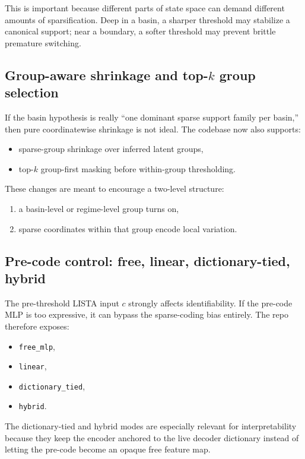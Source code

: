 \documentclass[11pt]{article}
\begin{document}
This is important because different parts of state space can demand different
amounts of sparsification. Deep in a basin, a sharper threshold may stabilize a
canonical support; near a boundary, a softer threshold may prevent brittle
premature switching.

\subsection{Group-aware shrinkage and top-$k$ group selection}

If the basin hypothesis is really ``one dominant sparse support family per
basin,'' then pure coordinatewise shrinkage is not ideal. The codebase now also
supports:
\begin{itemize}[leftmargin=1.5em]
    \item sparse-group shrinkage over inferred latent groups,
    \item top-$k$ group-first masking before within-group thresholding.
\end{itemize}

These changes are meant to encourage a two-level structure:
\begin{enumerate}[leftmargin=1.5em]
    \item a basin-level or regime-level group turns on,
    \item sparse coordinates within that group encode local variation.
\end{enumerate}

\subsection{Pre-code control: free, linear, dictionary-tied, hybrid}

The pre-threshold LISTA input $c$ strongly affects identifiability. If the
pre-code MLP is too expressive, it can bypass the sparse-coding bias entirely.
The repo therefore exposes:
\begin{itemize}[leftmargin=1.5em]
    \item \texttt{free\_mlp},
    \item \texttt{linear},
    \item \texttt{dictionary\_tied},
    \item \texttt{hybrid}.
\end{itemize}

The dictionary-tied and hybrid modes are especially relevant for
interpretability because they keep the encoder anchored to the live decoder
dictionary instead of letting the pre-code become an opaque free feature map.
\end{document}
